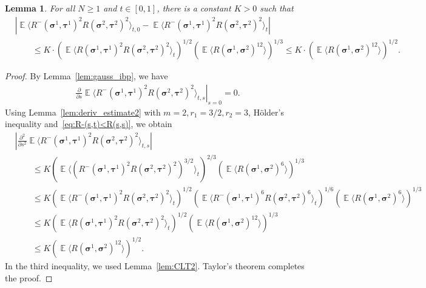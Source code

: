 \documentclass[letterpaper,11pt,reqno]{amsart}
\newtheorem{lem}[thm]{Lemma}
\renewcommand{\leq}{\leqslant}
\renewcommand{\geq}{\geqslant}
\newcommand{\ra}{\rangle}
\newcommand{\la}{\langle}
\newcommand{\abs}[1]{\left\vert#1\right\vert}
\newcommand{\mvgs}{\boldsymbol{\sigma}}\newcommand{\mvgS}{\boldsymbol{\Sigma}}\newcommand{\mvgt}{\boldsymbol{\tau}}
\DeclareMathOperator{\E}{\mathds{E}}
\begin{document}
\begin{lem}\label{lem:CLT1}
    For all \(N \geq 1\) and \(t \in [0,1]\), there is a constant \(K>0\) such that
    \begin{align*}
        &\abs{\E \la R^-(\mvgs^1, \mvgt^1)^2 R(\mvgs^2, \mvgt^2)^2 \ra_{t,0} - \E \la R^-(\mvgs^1, \mvgt^1)^2 R(\mvgs^2, \mvgt^2)^2 \ra_{t}} \\ 
        &\qquad \leq K\cdot \left(\E \la R(\mvgs^1, \mvgt^1)^2 R(\mvgs^2, \mvgt^2)^2  \ra_{t} \right)^{1/2}  (\E \la R(\mvgs^1, \mvgs^2)^{12} \ra )^{1/3}
        \leq K \cdot \left( \E \la R(\mvgs^1, \mvgs^2)^{12} \ra \right)^{1/2}.
    \end{align*}
\end{lem}
\begin{proof}
    By Lemma~\ref{lem:gauss_ibp}, we have
    \begin{align*}
        \left. \frac{\partial}{\partial s} \E \la R^-(\mvgs^1, \mvgt^1)^2 R(\mvgs^2, \mvgt^2)^2 \ra_{t,s} \right|_{s=0} 
        = 0.
    \end{align*}
    Using Lemma~\ref{lem:deriv_estimate2} with $m=2,r_{1}=3/2,r_{2}=3$, H\"older's inequality and~\eqref{eq:R-(s,t)<R(s,s)}, we obtain
        \begin{align*}
         &\abs{ \frac{\partial^2}{\partial s^2} \E \la R^-(\mvgs^1, \mvgt^1)^2 R(\mvgs^2, \mvgt^2)^2 \ra_{t,s} }\\
         &\qquad \leq K \left(\E \la \left( R^-(\mvgs^1, \mvgt^1)^2 R(\mvgs^2, \mvgt^2)^2 \right)^{3/2} \ra_{t} \right)^{2/3} (\E \la R(\mvgs^1, \mvgs^2)^{6} \ra )^{1/3}  \\
         &\qquad \leq K \left(\E \la R^-(\mvgs^1, \mvgt^1)^2 R(\mvgs^2, \mvgt^2)^2  \ra_{t} \right)^{1/2} \left(\E \la R^-(\mvgs^1, \mvgt^1)^6 R(\mvgs^2, \mvgt^2)^6  \ra_{t} \right)^{1/6} (\E \la R(\mvgs^1, \mvgs^2)^{6} \ra )^{1/3}  \\
         &\qquad \leq K \left(\E \la R(\mvgs^1, \mvgt^1)^2 R(\mvgs^2, \mvgt^2)^2  \ra_{t} \right)^{1/2}  (\E \la R(\mvgs^1, \mvgs^2)^{12} \ra )^{1/3} \\
         &\qquad \leq K (\E \la R(\mvgs^1, \mvgs^2)^{12} \ra )^{1/2}.
    \end{align*}
    In the third inequality, we used Lemma~\ref{lem:CLT2}.
    Taylor's theorem completes the proof.
\end{proof}
\end{document}
